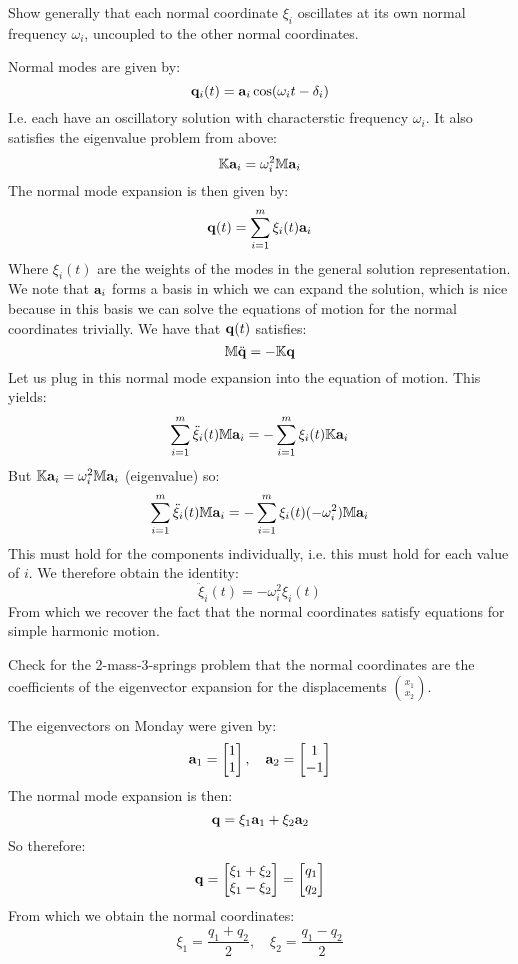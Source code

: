 \documentclass[../PHYS306Notes.tex]{subfiles}
\begin{document}
\begin{p}
Show generally that each normal coordinate $\xi_i$ oscillates at its own normal frequency $\omega_i$, uncoupled to the other normal coordinates. 
\end{p}
\begin{s}
Normal modes are given by:
\[\mathbf{q}_i(t) = \mathbf{a}_i\cos(\omega_i t - \delta_i)\]
I.e. each have an oscillatory solution with characterstic frequency $\omega_i$. It also satisfies the eigenvalue problem from above:
\[\mathbb{K}\mathbf{a}_i = \omega^2_i\mathbb{M}\mathbf{a}_i\]
The normal mode expansion is then given by:
\[\mathbf{q}(t) = \sum_{i=1}^m \xi_i(t)\mathbf{a}_i\]
Where $\xi_i(t)$ are the weights of the modes in the general solution representation. We note that $\mathbf{a}_i$ forms a basis in which we can expand the solution, which is nice because in this basis we can solve the equations of motion for the normal coordinates trivially. We have that $\mathbf{q}(t)$ satisfies:
\[\mathbb{M}\ddot{\mathbf{q}} = -\mathbb{K}\mathbf{q}\]
Let us plug in this normal mode expansion into the equation of motion. This yields:
\[\sum_{i=1}^m\ddot{\xi}_i(t)\mathbb{M}\mathbf{a}_i = -\sum_{i=1}^m\xi_i(t)\mathbb{K}\mathbf{a}_i\]
But $\mathbb{K}\mathbf{a}_i = \omega_i^2\mathbb{M}\mathbf{a}_i$ (eigenvalue) so:
\[\sum_{i=1}^m\ddot{\xi}_i(t)\mathbb{M}\mathbf{a}_i = -\sum_{i=1}^m\xi_i(t)(-\omega_i^2)\mathbb{M}\mathbf{a}_i\]
This must hold for the components individually, i.e. this must hold for each value of $i$. We therefore obtain the identity:
\[\ddot{\xi}_i(t) = -\omega_i^2\xi_i(t)\]
From which we recover the fact that the normal coordinates satisfy equations for simple harmonic motion.
\end{s}

\begin{p}
Check for the 2-mass-3-springs problem that the normal coordinates are the coefficients of the eigenvector expansion for the displacements $\binom{x_1}{x_2}$.
\end{p}
\begin{s}
The eigenvectors on Monday were given by:
\[\mathbf{a}_1 = \begin{bmatrix}1 \\ 1\end{bmatrix}, \quad \mathbf{a}_2 = \begin{bmatrix}1 \\ -1\end{bmatrix}\]
The normal mode expansion is then:
\[\mathbf{q} = \xi_1\mathbf{a}_1 + \xi_2\mathbf{a}_2\]
So therefore:
\[\mathbf{q} = \begin{bmatrix}\xi_1 + \xi_2 \\ \xi_1 - \xi_2\end{bmatrix} = \begin{bmatrix}q_1 \\ q_2\end{bmatrix}\]
From which we obtain the normal coordinates:
\[\xi_1 = \frac{q_1 + q_2}{2}, \quad \xi_2 = \frac{q_1 - q_2}{2}\]
\end{s}
\end{document}
